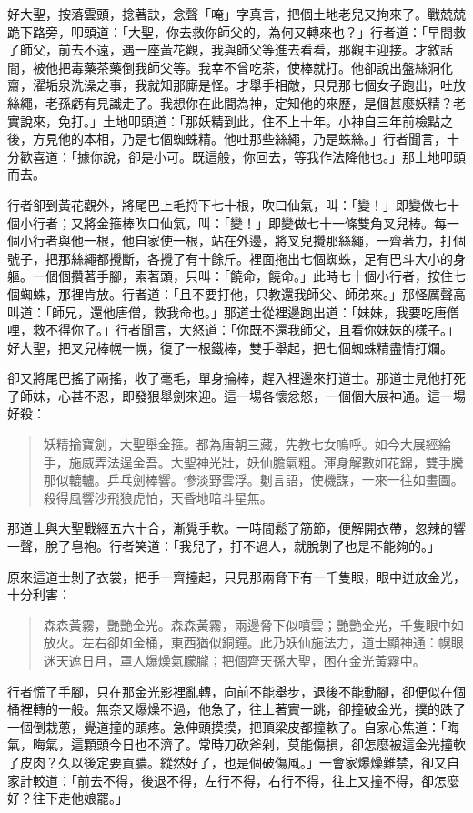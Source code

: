 好大聖，按落雲頭，捻著訣，念聲「唵」字真言，把個土地老兒又拘來了。戰兢兢跪下路旁，叩頭道：「大聖，你去救你師父的，為何又轉來也？」行者道：「早間救了師父，前去不遠，遇一座黃花觀，我與師父等進去看看，那觀主迎接。才敘話間，被他把毒藥茶藥倒我師父等。我幸不曾吃茶，使棒就打。他卻說出盤絲洞化齋，濯垢泉洗澡之事，我就知那廝是怪。才舉手相敵，只見那七個女子跑出，吐放絲繩，老孫虧有見識走了。我想你在此間為神，定知他的來歷，是個甚麼妖精？老實說來，免打。」土地叩頭道：「那妖精到此，住不上十年。小神自三年前檢點之後，方見他的本相，乃是七個蜘蛛精。他吐那些絲繩，乃是蛛絲。」行者聞言，十分歡喜道：「據你說，卻是小可。既這般，你回去，等我作法降他也。」那土地叩頭而去。

行者卻到黃花觀外，將尾巴上毛捋下七十根，吹口仙氣，叫：「變！」即變做七十個小行者；又將金箍棒吹口仙氣，叫：「變！」即變做七十一條雙角叉兒棒。每一個小行者與他一根，他自家使一根，站在外邊，將叉兒攪那絲繩，一齊著力，打個號子，把那絲繩都攪斷，各攪了有十餘斤。裡面拖出七個蜘蛛，足有巴斗大小的身軀。一個個攢著手腳，索著頭，只叫：「饒命，饒命。」此時七十個小行者，按住七個蜘蛛，那裡肯放。行者道：「且不要打他，只教還我師父、師弟來。」那怪厲聲高叫道：「師兄，還他唐僧，救我命也。」那道士從裡邊跑出道：「妹妹，我要吃唐僧哩，救不得你了。」行者聞言，大怒道：「你既不還我師父，且看你妹妹的樣子。」好大聖，把叉兒棒幌一幌，復了一根鐵棒，雙手舉起，把七個蜘蛛精盡情打爛。

卻又將尾巴搖了兩搖，收了毫毛，單身掄棒，趕入裡邊來打道士。那道士見他打死了師妹，心甚不忍，即發狠舉劍來迎。這一場各懷忿怒，一個個大展神通。這一場好殺：
\begin{quote}
妖精掄寶劍，大聖舉金箍。都為唐朝三藏，先教七女嗚呼。如今大展經綸手，施威弄法逞金吾。大聖神光壯，妖仙膽氣粗。渾身解數如花錦，雙手騰那似轆轤。乒乓劍棒響。慘淡野雲浮。劖言語，使機謀，一來一往如畫圖。殺得風響沙飛狼虎怕，天昏地暗斗星無。
\end{quote}

那道士與大聖戰經五六十合，漸覺手軟。一時間鬆了筋節，便解開衣帶，忽辣的響一聲，脫了皂袍。行者笑道：「我兒子，打不過人，就脫剝了也是不能夠的。」

原來這道士剝了衣裳，把手一齊擡起，只見那兩脅下有一千隻眼，眼中迸放金光，十分利害：
\begin{quote}
森森黃霧，艷艷金光。森森黃霧，兩邊脅下似噴雲；艷艷金光，千隻眼中如放火。左右卻如金桶，東西猶似銅鐘。此乃妖仙施法力，道士顯神通：幌眼迷天遮日月，罩人爆燥氣朦朧；把個齊天孫大聖，困在金光黃霧中。
\end{quote}

行者慌了手腳，只在那金光影裡亂轉，向前不能舉步，退後不能動腳，卻便似在個桶裡轉的一般。無奈又爆燥不過，他急了，往上著實一跳，卻撞破金光，撲的跌了一個倒栽蔥，覺道撞的頭疼。急伸頭摸摸，把頂梁皮都撞軟了。自家心焦道：「晦氣，晦氣，這顆頭今日也不濟了。常時刀砍斧剁，莫能傷損，卻怎麼被這金光撞軟了皮肉？久以後定要貢膿。縱然好了，也是個破傷風。」一會家爆燥難禁，卻又自家計較道：「前去不得，後退不得，左行不得，右行不得，往上又撞不得，卻怎麼好？往下走他娘罷。」

